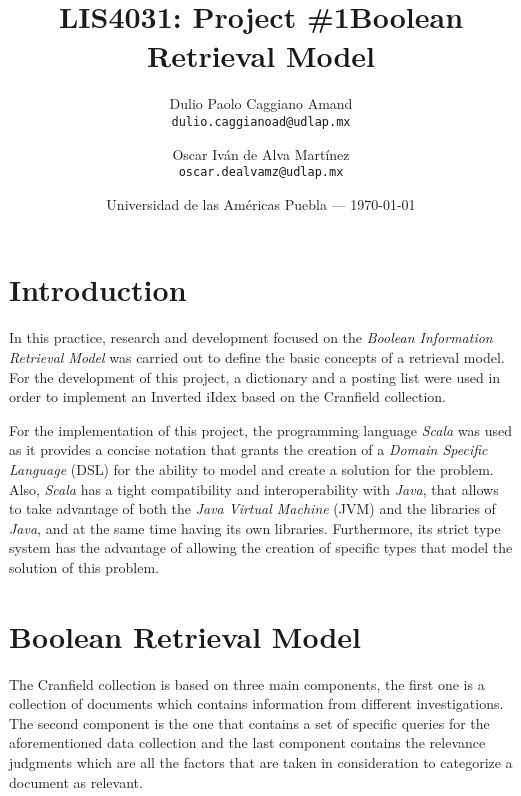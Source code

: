 \documentclass{article}
\title{LIS4031: Project \#1} %
\title{Boolean Retrieval Model} %
\author{
	Dulio Paolo Caggiano Amand\\ 
	\texttt{dulio.caggianoad@udlap.mx} 
	\and
	Oscar Iv\'an de Alva Mart\'inez\\ 
	\texttt{oscar.dealvamz@udlap.mx}
} %
\date{Universidad de las Am\'ericas  Puebla --- \today} %
\begin{document}
\maketitle %


\section*{Introduction} %

In this practice, research and development focused on the \textit{Boolean Information Retrieval Model} was carried out to define the basic concepts of a retrieval model. For the development of this project, a dictionary and a posting list were used in order to implement an Inverted iIdex based on the Cranfield collection.

For the implementation of this project, the programming language \textit{Scala} was used as it provides a concise notation that grants the creation of a \textit{Domain Specific Language} (DSL) for the ability to model and create a solution for the problem. Also, \textit{Scala} has a tight compatibility and interoperability with \textit{Java}, that allows to take advantage of both the \textit{Java Virtual Machine} (JVM) and the libraries of \textit{Java}, and at the same time having its own libraries. Furthermore, its strict type system has the advantage of allowing the creation of specific types that model the solution of this problem.


\section{Boolean Retrieval Model} %

The Cranfield collection is based on three main components, the first one is a collection of documents which contains information from different investigations. The second component is the one that contains a set of specific queries for the aforementioned data collection and the last component contains the relevance judgments which are all the factors that are taken in consideration to categorize a document as relevant.
\end{document}
